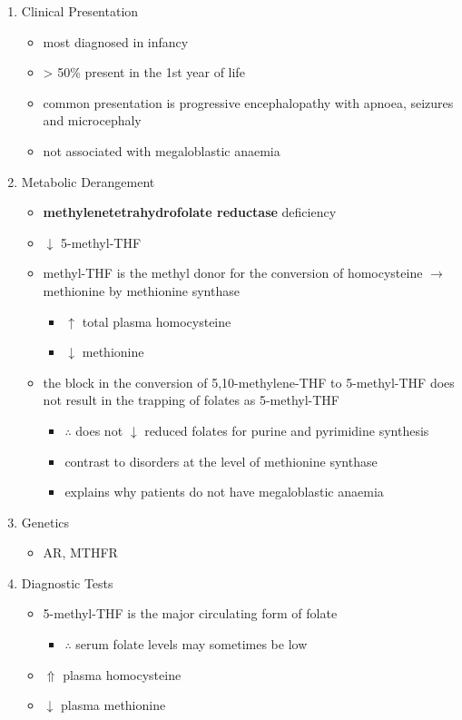 \documentclass{scrartcl}
\begin{document}
\begin{enumerate}
\item Clinical Presentation
\label{sec:org96d0af5}
\begin{itemize}
\item most diagnosed in infancy
\item \textgreater{} 50\% present in the 1st year of life
\item common presentation is progressive encephalopathy with apnoea,
seizures and microcephaly
\item not associated with megaloblastic anaemia
\end{itemize}

\item Metabolic Derangement
\label{sec:org3a47b2c}
\begin{itemize}
\item \textbf{methylenetetrahydrofolate reductase} deficiency
\end{itemize}
\begin{itemize}
\item \(\downarrow\) 5-methyl-THF
\item methyl-THF is the methyl donor for the conversion of homocysteine
\(\to\) methionine by methionine synthase
\begin{itemize}
\item \(\uparrow\) total plasma homocysteine
\item \(\downarrow\) methionine
\end{itemize}
\item the block in the conversion of 5,10-methylene-THF to 5-methyl-THF does not
result in the trapping of folates as 5-methyl-THF
\begin{itemize}
\item \(\therefore\) does not \(\downarrow\) reduced folates for purine and
pyrimidine synthesis
\item contrast to disorders at the level of methionine synthase
\item explains why patients do not have megaloblastic anaemia
\end{itemize}
\end{itemize}

\item Genetics
\label{sec:orge32a853}
\begin{itemize}
\item AR, MTHFR
\end{itemize}

\item Diagnostic Tests
\label{sec:org4f5fead}
\begin{itemize}
\item 5-methyl-THF is the major circulating form of folate
\begin{itemize}
\item \(\therefore\) serum folate levels may sometimes be low
\end{itemize}
\item \(\Uparrow\) plasma homocysteine
\item \(\downarrow\) plasma methionine
\end{itemize}


\end{enumerate}
\end{document}
